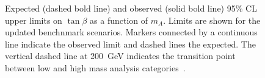 \begin{figure}[h]
{  }
  \caption{
Expected (dashed bold line) and observed (solid bold line) 95\% CL upper limits
on $\tan\beta$ as a function of $m_A$. Limits are shown for the updated benchnmark scenarios. 
Markers connected by a continuous line indicate the observed limit and dashed
lines the expected. The vertical dashed line at 200~GeV indicates the transition point between low and
high mass analysis categories~\cite{}.
}
  \label{fig:ex2}
\end{figure}




















